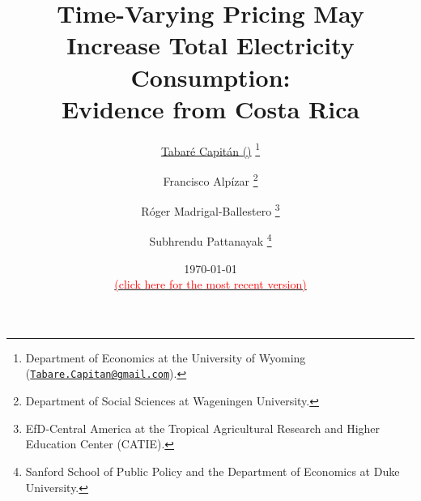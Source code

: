 \title{\vspace{-2cm}
      \normalsize{\textbf{Time-Varying Pricing May Increase Total Electricity Consumption: \\ Evidence from Costa Rica}}
      }

\author{

    \small{\href{www.TabareCapitan.com}{Tabaré Capitán (\Letter)}}
        \thanks{
           Department of Economics at the University of Wyoming (\href{mailto:Tabare.Capitan@gmail.com}{\texttt{Tabare.Capitan@gmail.com}}).
        }

  \and
    \small{Francisco Alpízar}
        \thanks{
          Department of Social Sciences at Wageningen University.
        }

  \and
    \small{Róger Madrigal-Ballestero}
        \thanks{
          EfD‐Central America at the Tropical Agricultural Research and Higher Education Center (CATIE).
        }

  \and
    \small{Subhrendu Pattanayak}
        \thanks{
          Sanford School of Public Policy and the Department of Economics at Duke University.
        }
}


\date{
  \vspace{0.2cm}
  \footnotesize{\today}
  \\
  \href{https://www.tabarecapitan.com}
  {\footnotesize{\textcolor{red}{(click here for the most recent version)}}}
}

\maketitle

\thispagestyle{empty}   %

